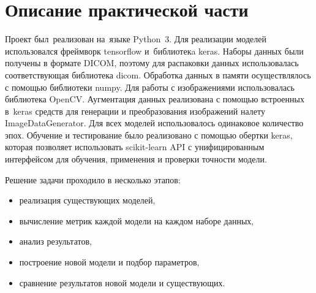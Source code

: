 \section{Описание практической части}

Проект был~реализован на~языке Python~3. Для реализации моделей использовался фреймворк tensorflow и~библиотекa keras. Наборы данных были получены в формате DICOM, поэтому для распаковки данных использовалась соответствующая библиотека dicom. Обработка данных в памяти осуществлялось с помощью библиотеки numpy. Для работы с изображениями использовалась библиотека OpenCV. Аугментация данных реализована с помощью встроенных в~keras средств для генерации и преобразования изображений налету ImageDataGenerator. Для всех моделей использовалось одинаковое количество эпох. Обучение и тестирование было реализовано с помощью обертки keras, которая позволяет использовать scikit-learn API с унифицированным интерфейсом для обучения, применения и проверки точности модели.

Решение задачи проходило в несколько этапов:

\begin{itemize}
  \item реализация существующих моделей,
  \item вычисление метрик каждой модели на каждом наборе данных,
  \item анализ результатов,
  \item построение новой модели и подбор параметров,
  \item сравнение результатов новой модели и существующих.
\end{itemize}

